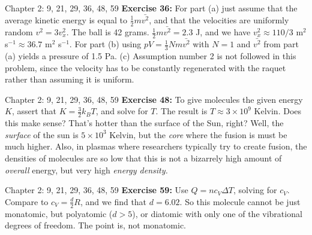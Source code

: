 \documentclass{beamer}
\begin{document}
\begin{frame}{Chapter 2: 9, 21, 29, 36, 48, 59}
\small
\textbf{Exercise 36:} For part (a) just assume that the average kinetic energy is equal to $\frac{1}{2}m\bar{v^2}$, and that the velocities are uniformly random $v^2 = 3 v_x^2$.  The ball is 42 grams. $\frac{1}{2}m\bar{v^2} = 2.3$ J, and we have $v_x^2 \approx 110/3$ m$^2$ s$^{-1} \approx 36.7$ m$^2$ s$^{-1}$. For part (b) using $pV = \frac{1}{3}N m \bar{v^2}$ with $N=1$ and $\bar{v^2}$ from part (a) yields a pressure of 1.5 Pa.  (c) Assumption number 2 is not followed in this problem, since the velocity has to be constantly regenerated with the raquet rather than assuming it is uniform.
\end{frame}

\begin{frame}{Chapter 2: 9, 21, 29, 36, 48, 59}
\small
\textbf{Exercise 48:} To give molecules the given energy $K$, assert that $K = \frac{3}{2}k_B T$, and solve for $T$.  The result is $T \approx 3 \times 10^9$ Kelvin.  Does this make sense?  That's hotter than the surface of the Sun, right?  Well, the \textit{surface} of the sun is $5\times 10^3$ Kelvin, but the \textit{core} where the fusion is must be much higher.  Also, in plasmas where researchers typically try to create fusion, the densities of molecules are so low that this is not a bizarrely high amount of \textit{overall} energy, but very high \textit{energy density.}
\end{frame}

\begin{frame}{Chapter 2: 9, 21, 29, 36, 48, 59}
\small
\textbf{Exercise 59:} Use $Q = n c_V \Delta T$, solving for $c_V$.  Compare to $c_V = \frac{d}{2}R$, and we find that $d = 6.02$.  So this molecule cannot be just monatomic, but polyatomic ($d>5$), or diatomic with only one of the vibrational degrees of freedom.  The point is, not monatomic.
\end{frame}
\end{document}
